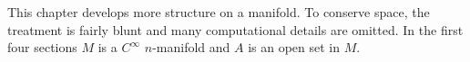 \documentclass[../main]{subfiles}
\begin{document}
This chapter develops more structure on a manifold. To conserve space, the treatment is fairly blunt and many computational details are omitted. In the first four sections $M$ is a $C^\infty$ $n$-manifold and $A$ is an open set in $M$. 
\end{document}
